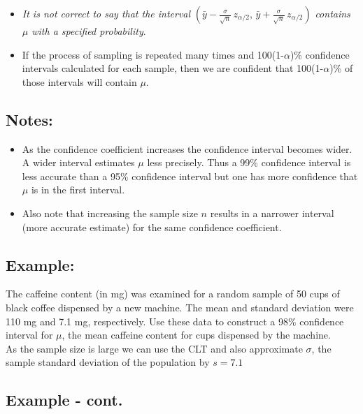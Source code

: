 \documentclass[
  letterpaper,
  DIV=11,
  numbers=noendperiod]{scrartcl}
\begin{document}
\begin{itemize}
\item
  {\emph{It is not correct to say that the interval}}
  \((\bar{y} - \frac{\sigma}{\sqrt{n}} \, z_{\alpha/2},\,
  \bar{y} + \frac{\sigma}{\sqrt{n}} \, z_{\alpha/2})\) {\emph{contains
  \(\mu\) with a specified probability}}.
\item
  If the process of sampling is repeated many times and
  100(1-\(\alpha\))\% confidence intervals calculated for each sample,
  then we are confident that 100(1-\(\alpha\))\% of those intervals will
  contain \(\mu\).
\end{itemize}

\subsection{Notes:}\label{notes}

\begin{itemize}
\item
  As the confidence coefficient increases the confidence interval
  becomes wider. A wider interval estimates \(\mu\) less precisely. Thus
  a 99\% confidence interval is {less accurate} than a 95\% confidence
  interval but one has {more confidence} that \(\mu\) is in the first
  interval.
\item
  Also note that increasing the sample size \(n\) results in a narrower
  interval (more accurate estimate) for the same confidence coefficient.
\end{itemize}

\subsection{Example:}\label{example}

The caffeine content (in mg) was examined for a random sample of 50 cups
of black coffee dispensed by a new machine. The mean and standard
deviation were 110 mg and 7.1 mg, respectively. Use these data to
construct a 98\% confidence interval for \(\mu\), the mean caffeine
content for cups dispensed by the machine.\\
As the sample size is large we can use the CLT and also approximate
\(\sigma\), the sample standard deviation of the population by \(s=7.1\)

\subsection{Example - cont.}\label{example---cont.}
\end{document}
